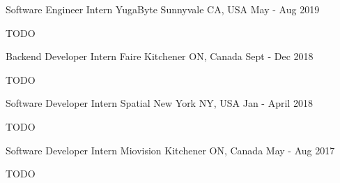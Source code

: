 
\begin{cventries}

\cventry
    {Software Engineer Intern}
    {YugaByte}
    {Sunnyvale CA, USA}
    {May - Aug 2019}
    {
      \begin{cvitems}
      	\item TODO
      \end{cvitems}
    }

\cventry
    {Backend Developer Intern}
    {Faire}
    {Kitchener ON, Canada}
    {Sept - Dec 2018}
    {
      \begin{cvitems}
      	\item TODO
      \end{cvitems}
    }
    
\cventry
    {Software Developer Intern}
    {Spatial}
    {New York NY, USA}
    {Jan - April 2018}
    {
      \begin{cvitems}
      	\item TODO
      \end{cvitems}
    }
    
\cventry
    {Software Developer Intern}
    {Miovision}
    {Kitchener ON, Canada}
    {May - Aug 2017}
    {
      \begin{cvitems}
      	\item TODO
      \end{cvitems}
    }

\end{cventries}